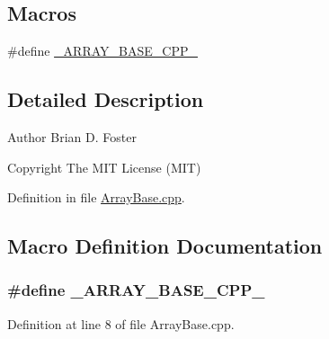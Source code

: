 \subsection*{Macros}
\begin{DoxyCompactItemize}
\item 
\#define \hyperlink{a00003_aeb58186c19f02cd09f0d5295a03a8a87}{\+\_\+\+A\+R\+R\+A\+Y\+\_\+\+B\+A\+S\+E\+\_\+\+C\+P\+P\+\_\+}
\end{DoxyCompactItemize}


\subsection{Detailed Description}
\begin{DoxyAuthor}{Author}
Brian D. Foster 
\end{DoxyAuthor}
\begin{DoxyCopyright}{Copyright}
The M\+I\+T License (M\+I\+T) 
\end{DoxyCopyright}


Definition in file \hyperlink{a00003_source}{Array\+Base.\+cpp}.



\subsection{Macro Definition Documentation}
\hypertarget{a00003_aeb58186c19f02cd09f0d5295a03a8a87}{
\subsubsection[{\+\_\+\+A\+R\+R\+A\+Y\+\_\+\+B\+A\+S\+E\+\_\+\+C\+P\+P\+\_\+}]{\setlength{\rightskip}{0pt plus 5cm}\#define \+\_\+\+A\+R\+R\+A\+Y\+\_\+\+B\+A\+S\+E\+\_\+\+C\+P\+P\+\_\+}}\label{a00003_aeb58186c19f02cd09f0d5295a03a8a87}


Definition at line 8 of file Array\+Base.\+cpp.

